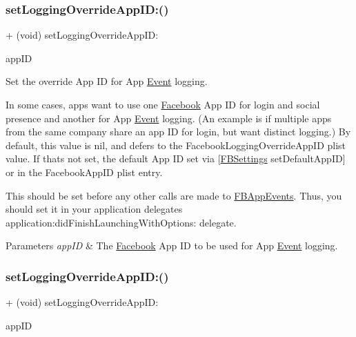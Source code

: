 \subsubsection{\texorpdfstring{set\+Logging\+Override\+App\+I\+D\+:()}{setLoggingOverrideAppID:()}\hspace{0.1cm}{\footnotesize\ttfamily [4/5]}}
{\footnotesize\ttfamily + (void) set\+Logging\+Override\+App\+I\+D\+: \begin{DoxyParamCaption}\item[{(N\+S\+String $\ast$)}]{app\+ID }\end{DoxyParamCaption}}

Set the \textquotesingle{}override\textquotesingle{} App ID for App \hyperlink{classEvent}{Event} logging.

In some cases, apps want to use one \hyperlink{interfaceFacebook}{Facebook} App ID for login and social presence and another for App \hyperlink{classEvent}{Event} logging. (An example is if multiple apps from the same company share an app ID for login, but want distinct logging.) By default, this value is {\ttfamily nil}, and defers to the {\ttfamily Facebook\+Logging\+Override\+App\+ID} plist value. If that\textquotesingle{}s not set, the default App ID set via \mbox{[}\hyperlink{interfaceFBSettings}{F\+B\+Settings} set\+Default\+App\+ID\mbox{]} or in the {\ttfamily Facebook\+App\+ID} plist entry.

This should be set before any other calls are made to {\ttfamily \hyperlink{interfaceFBAppEvents}{F\+B\+App\+Events}}. Thus, you should set it in your application delegate\textquotesingle{}s {\ttfamily application\+:did\+Finish\+Launching\+With\+Options\+:} delegate.


\begin{DoxyParams}{Parameters}
{\em app\+ID} & The \hyperlink{interfaceFacebook}{Facebook} App ID to be used for App \hyperlink{classEvent}{Event} logging. \\
\hline
\end{DoxyParams}
\mbox{\label{interfaceFBAppEvents_a3f9d06a1e8b3d482efc5c438827fbc6e}} 
\subsubsection{\texorpdfstring{set\+Logging\+Override\+App\+I\+D\+:()}{setLoggingOverrideAppID:()}\hspace{0.1cm}{\footnotesize\ttfamily [5/5]}}
{\footnotesize\ttfamily + (void) set\+Logging\+Override\+App\+I\+D\+: \begin{DoxyParamCaption}\item[{(N\+S\+String $\ast$)}]{app\+ID }\end{DoxyParamCaption}}

